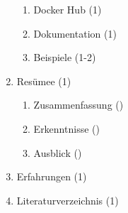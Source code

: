 \documentclass[a4paper, parskip=false, ngerman]{scrreprt}
\begin{document}
\begin{enumerate}[label*=\arabic*.]
\begin{enumerate}[label*=\arabic*.]
        \item Docker Hub (1)
        \item Dokumentation (1)
        \item Beispiele (1-2)
    \end{enumerate}
    \item Resümee (1)
    \begin{enumerate}[label*=\arabic*.]
        \item Zusammenfassung ()
        \item Erkenntnisse ()
        \item Ausblick ()
    \end{enumerate}
    \item Erfahrungen (1)
    \item Literaturverzeichnis (1)
\end{enumerate}
\end{document}
